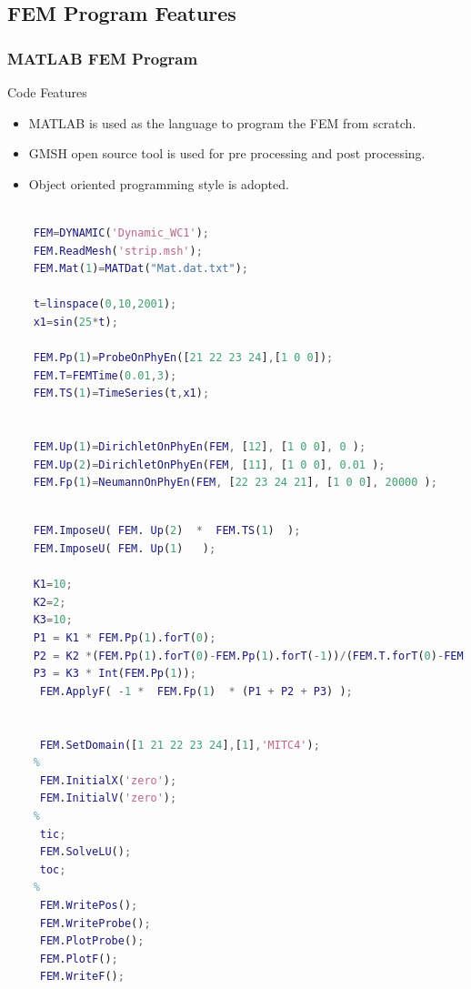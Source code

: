 \documentclass[9pt]{beamer}
\begin{document}
\subsection{FEM Program Features}
\begin{frame}[fragile]\frametitle{MATLAB FEM Program }
\begin{block}{Code Features}
\begin{itemize}
\item MATLAB is used as the language to program the FEM from scratch.
\item GMSH open source tool is used for pre processing and post processing.
\item Object oriented programming style is adopted.
\end{itemize}
\end{block}

\begin{lstlisting}[language=matlab,caption=Example input script]

    FEM=DYNAMIC('Dynamic_WC1');
    FEM.ReadMesh('strip.msh');
    FEM.Mat(1)=MATDat("Mat.dat.txt");

    t=linspace(0,10,2001);
    x1=sin(25*t);    

    FEM.Pp(1)=ProbeOnPhyEn([21 22 23 24],[1 0 0]);
    FEM.T=FEMTime(0.01,3);
    FEM.TS(1)=TimeSeries(t,x1);


    FEM.Up(1)=DirichletOnPhyEn(FEM, [12], [1 0 0], 0 );
    FEM.Up(2)=DirichletOnPhyEn(FEM, [11], [1 0 0], 0.01 );
    FEM.Fp(1)=NeumannOnPhyEn(FEM, [22 23 24 21], [1 0 0], 20000 );
\end{lstlisting}

\end{frame}

\begin{frame}[fragile] 
  \begin{lstlisting}[language=matlab]
  
    FEM.ImposeU( FEM. Up(2)  *  FEM.TS(1)  );
    FEM.ImposeU( FEM. Up(1)   );

    K1=10;
    K2=2;
    K3=10; 
    P1 = K1 * FEM.Pp(1).forT(0);
    P2 = K2 *(FEM.Pp(1).forT(0)-FEM.Pp(1).forT(-1))/(FEM.T.forT(0)-FEM.T.forT(-1));
    P3 = K3 * Int(FEM.Pp(1));
     FEM.ApplyF( -1 *  FEM.Fp(1)  * (P1 + P2 + P3) );
    

     FEM.SetDomain([1 21 22 23 24],[1],'MITC4');
    % 
     FEM.InitialX('zero');
     FEM.InitialV('zero');
    % 
     tic;
     FEM.SolveLU();
     toc;
    % 
     FEM.WritePos();
     FEM.WriteProbe();
     FEM.PlotProbe();
     FEM.PlotF();
     FEM.WriteF();

\end{lstlisting}
\end{frame}
\end{document}
